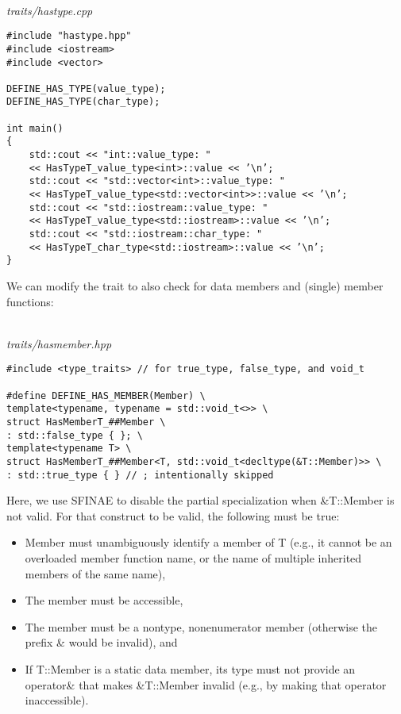 \hspace*{\fill} \\ %
\noindent
\textit{traits/hastype.cpp}
\begin{lstlisting}[style=styleCXX]
#include "hastype.hpp"
#include <iostream>
#include <vector>

DEFINE_HAS_TYPE(value_type);
DEFINE_HAS_TYPE(char_type);

int main()
{
	std::cout << "int::value_type: "
	<< HasTypeT_value_type<int>::value << ’\n’;
	std::cout << "std::vector<int>::value_type: "
	<< HasTypeT_value_type<std::vector<int>>::value << ’\n’;
	std::cout << "std::iostream::value_type: "
	<< HasTypeT_value_type<std::iostream>::value << ’\n’;
	std::cout << "std::iostream::char_type: "
	<< HasTypeT_char_type<std::iostream>::value << ’\n’;
}
\end{lstlisting}


We can modify the trait to also check for data members and (single) member functions:

\hspace*{\fill} \\ %
\noindent
\textit{traits/hasmember.hpp}
\begin{lstlisting}[style=styleCXX]
#include <type_traits> // for true_type, false_type, and void_t

#define DEFINE_HAS_MEMBER(Member) \
template<typename, typename = std::void_t<>> \
struct HasMemberT_##Member \
: std::false_type { }; \
template<typename T> \
struct HasMemberT_##Member<T, std::void_t<decltype(&T::Member)>> \
: std::true_type { } // ; intentionally skipped
\end{lstlisting}

Here, we use SFINAE to disable the partial specialization when \&T::Member is not valid. For that construct to be valid, the following must be true:

\begin{itemize}
\item
Member must unambiguously identify a member of T (e.g., it cannot be an overloaded member function name, or the name of multiple inherited members of the same name),

\item
The member must be accessible,

\item
The member must be a nontype, nonenumerator member (otherwise the prefix \& would be invalid), and

\item
If T::Member is a static data member, its type must not provide an operator\& that makes \&T::Member invalid (e.g., by making that operator inaccessible).
\end{itemize}

